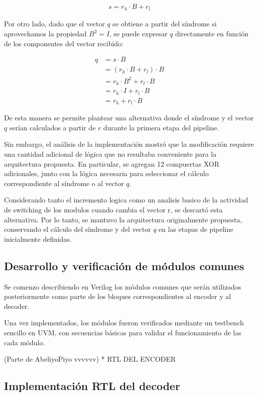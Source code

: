 \begin{align*}
    s = r_h \cdot B + r_l
\end{align*}

Por otro lado, dado que el vector $q$ se obtiene a partir del síndrome si aprovechamos la propiedad $B^2 = I$, se puede expresar $q$ directamente en
función de los componentes del vector recibido:

\begin{align*}
    q &= s\cdot B \\
    &= (r_h\cdot B + r_l)\cdot B\\
    &= r_h\cdot B^2 + r_l\cdot B \\
    &= r_h\cdot I + r_l\cdot B \\
    &= r_h + r_l\cdot B
\end{align*}

De esta manera se permite plantear una alternativa donde el síndrome y el vector $q$ serían calculados a partir de $r$ durante la primera etapa del pipeline.

Sin embargo, el análisis de la implementación mostró que la modificación requiere una cantidad adicional de lógica que no resultaba conveniente para la arquitectura propuesta. En particular, se agregan 12 compuertas XOR adicionales, junto con la lógica necesaria para seleccionar el cálculo correspondiente al síndrome o al vector $q$.

Considerando tanto el incremento logica como un analisis basico de la actividad de switching de los modulos cuando cambia el vector r, se descartó esta alternativa. Por lo tanto, se mantuvo la arquitectura originalmente propuesta, conservando el cálculo del síndrome y del vector $q$ en las etapas de pipeline inicialmente definidas.

\subsection{Desarrollo y verificación de módulos comunes}
Se comenzo describiendo en Verilog los módulos comunes que serán utilizados posteriormente como parte de los bloques correspondientes al encoder y al decoder. 

Una vez implementados, los módulos fueron verificados mediante un testbench sencillo en UVM, con secuencias básicas para validar el funcionamiento de las cada módulo.

(Parte de AbeliyoPiyo vvvvvv)
* RTL DEL ENCODER

\subsection{Implementación RTL del decoder}

